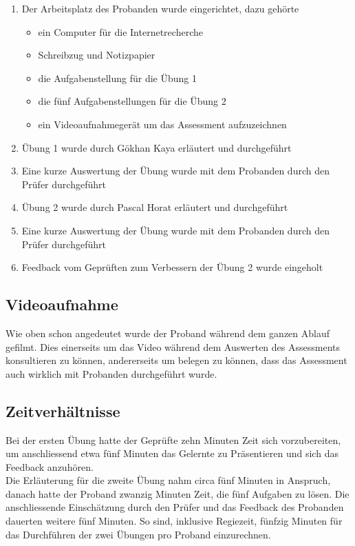 \begin{enumerate}
\item Der Arbeitsplatz des Probanden wurde eingerichtet, dazu gehörte
\begin{itemize}
\item ein Computer für die Internetrecherche
\item Schreibzug und Notizpapier
\item die Aufgabenstellung für die Übung 1
\item die fünf Aufgabenstellungen für die Übung 2
\item ein Videoaufnahmegerät um das Assessment aufzuzeichnen
\end{itemize}
\item Übung 1 wurde durch Gökhan Kaya erläutert und durchgeführt
\item Eine kurze Auswertung der Übung wurde mit dem Probanden durch den Prüfer durchgeführt
\item Übung 2 wurde durch Pascal Horat erläutert und durchgeführt
\item Eine kurze Auswertung der Übung wurde mit dem Probanden durch den Prüfer durchgeführt
\item Feedback vom Geprüften zum Verbessern der Übung 2 wurde eingeholt
\end{enumerate}

\subsection{Videoaufnahme}

Wie oben schon angedeutet wurde der Proband während dem ganzen Ablauf gefilmt. Dies einerseits um das Video während dem Auswerten des Assessments konsultieren zu können, andererseits um belegen zu können, dass das Assessment auch wirklich mit Probanden durchgeführt wurde.
\subsection{Zeitverhältnisse}
Bei der ersten Übung hatte der Geprüfte zehn Minuten Zeit sich vorzubereiten, um anschliessend etwa fünf Minuten das Gelernte zu Präsentieren und sich das Feedback anzuhören.\\ Die Erläuterung für die zweite Übung nahm circa fünf Minuten in Anspruch, danach hatte der Proband zwanzig Minuten Zeit, die fünf Aufgaben zu lösen. Die anschliessende Einschätzung durch den Prüfer und das Feedback des Probanden dauerten weitere fünf Minuten. So sind, inklusive Regiezeit, fünfzig Minuten für das Durchführen der zwei Übungen pro Proband einzurechnen.
